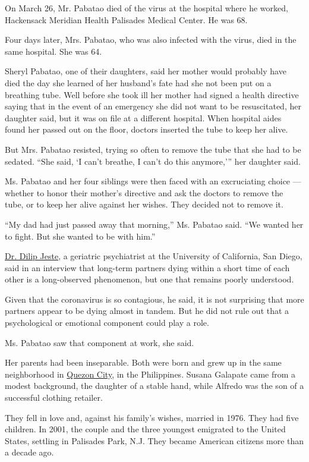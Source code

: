 On March 26, Mr. Pabatao died of the virus at the hospital where he
worked, Hackensack Meridian Health Palisades Medical Center. He was 68.

Four days later, Mrs. Pabatao, who was also infected with the virus,
died in the same hospital. She was 64.

Sheryl Pabatao, one of their daughters, said her mother would probably
have died the day she learned of her husband's fate had she not been put
on a breathing tube. Well before she took ill her mother had signed a
health directive saying that in the event of an emergency she did not
want to be resuscitated, her daughter said, but it was on file at a
different hospital. When hospital aides found her passed out on the
floor, doctors inserted the tube to keep her alive.

But Mrs. Pabatao resisted, trying so often to remove the tube that she
had to be sedated. ``She said, `I can't breathe, I can't do this
anymore,''' her daughter said.

Ms. Pabatao and her four siblings were then faced with an excruciating
choice --- whether to honor their mother's directive and ask the doctors
to remove the tube, or to keep her alive against her wishes. They
decided not to remove it.

``My dad had just passed away that morning,'' Ms. Pabatao said. ``We
wanted her to fight. But she wanted to be with him.''

\href{https://profiles.ucsd.edu/dilip.jeste}{Dr. Dilip Jeste}, a
geriatric psychiatrist at the University of California, San Diego, said
in an interview that long-term partners dying within a short time of
each other is a long-observed phenomenon, but one that remains poorly
understood.

Given that the coronavirus is so contagious, he said, it is not
surprising that more partners appear to be dying almost in tandem. But
he did not rule out that a psychological or emotional component could
play a role.

Ms. Pabatao saw that component at work, she said.

Her parents had been inseparable. Both were born and grew up in the same
neighborhood in \href{https://quezoncity.gov.ph/}{Quezon City}, in the
Philippines. Susana Galapate came from a modest background, the daughter
of a stable hand, while Alfredo was the son of a successful clothing
retailer.

They fell in love and, against his family's wishes, married in 1976.
They had five children. In 2001, the couple and the three youngest
emigrated to the United States, settling in Palisades Park, N.J. They
became American citizens more than a decade ago.

